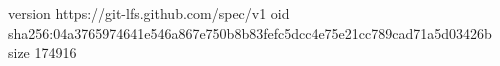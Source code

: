 version https://git-lfs.github.com/spec/v1
oid sha256:04a3765974641e546a867e750b8b83fefc5dcc4e75e21cc789cad71a5d03426b
size 174916
